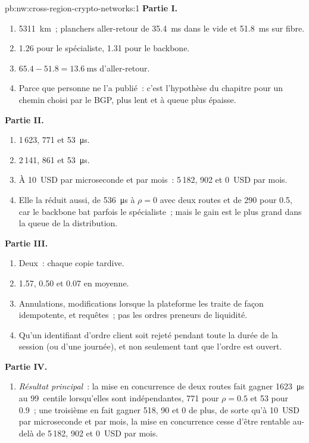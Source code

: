 \begin{solution}{pb:nw:cross-region-crypto-networks:1}
\textbf{Partie I.}
\begin{enumerate}
\item \qty{5311}{\kilo\metre}~; planchers aller-retour de \qty{35.4}{\milli\second} dans le vide et \qty{51.8}{\milli\second} sur fibre.
\item 1.26 pour le spécialiste, 1.31 pour le backbone.
\item $65.4 - 51.8 = \qty{13.6}{\milli\second}$ d'aller-retour.
\item Parce que personne ne l'a publié~: c'est l'hypothèse du chapitre pour un chemin choisi par le BGP, plus lent et à queue plus épaisse.
\end{enumerate}
\textbf{Partie II.}
\begin{enumerate}[resume]
\item 1\,623, 771 et \qty{53}{\micro\second}.
\item 2\,141, 861 et \qty{53}{\micro\second}.
\item À 10~USD par microseconde et par mois~: 5\,182, 902 et 0~USD par mois.
\item Elle la réduit aussi, de \qty{536}{\micro\second} à $\rho = 0$ avec deux routes et de 290 pour 0.5, car le backbone bat parfois le
  spécialiste~; mais le gain est le plus grand dans la queue de la distribution.
\end{enumerate}
\textbf{Partie III.}
\begin{enumerate}[resume]
\item Deux~: chaque copie tardive.
\item 1.57, 0.50 et 0.07 en moyenne.
\item Annulations, modifications lorsque la plateforme les traite de façon idempotente, et requêtes~; pas les ordres preneurs de liquidité.
\item Qu'un identifiant d'ordre client soit rejeté pendant toute la durée de la session (ou d'une journée), et non seulement tant que l'ordre est ouvert.
\end{enumerate}
\textbf{Partie IV.}
\begin{enumerate}[resume]
\item \emph{Résultat principal}~: la mise en concurrence de deux routes fait gagner \qty{1623}{\micro\second} au 99~centile lorsqu'elles sont indépendantes, 771 pour $\rho = 0.5$ et 53 pour
  0.9~; une troisième en fait gagner 518, 90 et 0 de plus, de sorte qu'à 10~USD par microseconde et par mois, la mise en concurrence cesse d'être rentable au-delà de 5\,182, 902 et 0~USD par mois.

\end{enumerate}
\end{solution}
